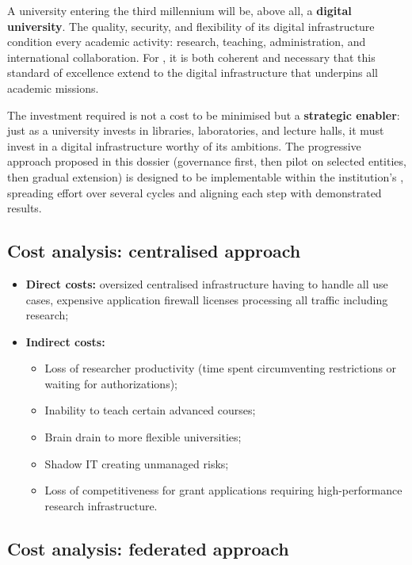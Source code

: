 A university entering the third millennium will be, above all, a
\textbf{digital university}. The quality, security, and flexibility of
its digital infrastructure condition every academic activity: research,
teaching, administration, and international collaboration. For , it
is both coherent and necessary that this standard of excellence extend
to the digital infrastructure that underpins all academic missions.

\medskip\noindent
The investment required is not a cost to be minimised but a
\textbf{strategic enabler}: just as a university invests in libraries,
laboratories, and lecture halls, it must invest in a digital
infrastructure worthy of its ambitions. The progressive approach
proposed in this dossier (governance first, then pilot on selected
entities, then gradual extension) is designed to be implementable
within the institution's ,
spreading effort over several cycles and aligning each step with
demonstrated results.

\subsection{Cost analysis: centralised approach}

\begin{itemize}
    \item \textbf{Direct costs:} oversized centralised infrastructure
    having to handle all use cases, expensive application firewall licenses
    processing all traffic including research;
    \item \textbf{Indirect costs:}
    \begin{itemize}[nosep]
        \item Loss of researcher productivity (time spent
        circumventing restrictions or waiting for authorizations);
        \item Inability to teach certain advanced courses;
        \item Brain drain to more flexible universities;
        \item Shadow IT creating unmanaged risks;
        \item Loss of competitiveness for grant applications
        requiring high-performance research infrastructure.
    \end{itemize}
\end{itemize}

\subsection{Cost analysis: federated approach}

